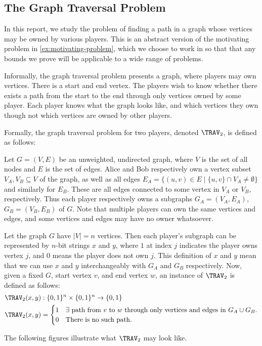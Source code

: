 \subsection{The Graph Traversal Problem}

In this report, we study the problem of finding a path in a graph whose vertices may be owned by various players. This is an abstract version of the motivating problem in \ref{ex:motivating-problem}, which we choose to work in so that that any bounds we prove will be applicable to a wide range of problems.

Informally, the graph traversal problem presents a graph, where players may own vertices. There is a start and end vertex. The players wish to know whether there exists a path from the start to the end through only vertices owned by some player. Each player knows what the graph looks like, and which vertices they own though not which vertices are owned by other players.

Formally, the graph traversal problem for two players, denoted $\TRAV_2$, is defined as follows:

\begin{definition}
Let $G = (V,E)$ be an unweighted, undirected graph, where $V$ is the set of all nodes and $E$ is the set of edges. Alice and Bob respectively own a vertex subset $V_A, V_B \subseteq V$ of the graph, as well as all edges $E_A = \{(u,v) \in E \mid \{u, v\} \cap V_A \neq \emptyset\}$ and similarly for $E_B$. These are all edges connected to some vertex in $V_A$ or $V_B$, respectively. Thus each player respectively owns a subgraphs $G_A = (V_A, E_A)$, $G_B = (V_B, E_B)$ of $G$. Note that multiple players can own the same vertices and edges, and some vertices and edges may have no owner whatsoever.

Let the graph $G$ have $|V| = n$ vertices. Then each player's subgraph can be represented by $n$-bit strings $x$ and $y$, where $1$ at index $j$ indicates the player owns vertex $j$, and $0$ means the player does not own $j$. This definition of $x$ and $y$ mean that we can use $x$ and $y$ interchangeably with $G_A$ and $G_B$ respectively. Now, given a fixed $G$, start vertex $v$, and end vertex $w$, an instance of $\TRAV_2$ is defined as follows:
\begin{align}
    \TRAV_2(x,y) &: \{0,1\}^n \times \{0,1\}^n \to \{0,1\} \\
    \TRAV_2(x,y) &= \begin{cases}
        1 & \text{$\exists$ path from $v$ to $w$ through only vertices and edges in $G_A \cup G_B$.} \\
        0 & \text{There is no such path.}
    \end{cases}
\end{align}
\end{definition}
The following figures illustrate what $\TRAV_2$ may look like.




